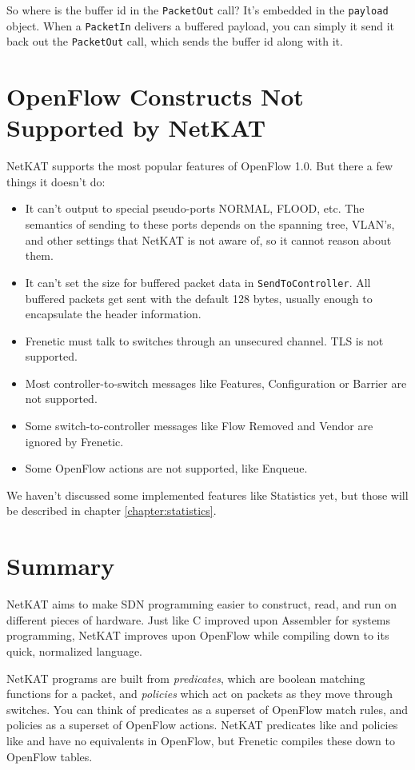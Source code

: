 So where is the buffer id in the \texttt{PacketOut} call?  It's embedded in the \texttt{payload} object.
When a \texttt{PacketIn} delivers a buffered payload, you can simply it send it back out the \texttt{PacketOut}
call, which sends the buffer id along with it.  

\section{OpenFlow Constructs Not Supported by NetKAT}

NetKAT supports the most popular features of OpenFlow 1.0.  But there a few things it doesn't do:

\begin{itemize}
\item It can't output to special pseudo-ports NORMAL, FLOOD, etc.  The semantics of sending to these ports
depends on the spanning tree, VLAN's, and other settings that NetKAT is not aware of, so it cannot reason
about them. 
\item It can't set the size for buffered packet data in \texttt{SendToController}.  All buffered packets
get sent with the default 128 bytes, usually enough to encapsulate the header information.
\item Frenetic must talk to switches through an unsecured channel.  TLS is not supported.
\item Most controller-to-switch messages like Features, Configuration or Barrier are not supported.
\item Some switch-to-controller messages like Flow Removed and Vendor are ignored by Frenetic. 
\item Some OpenFlow actions are not supported, like Enqueue.   
\end{itemize}

We haven't discussed some implemented features like Statistics yet, but those will be described in chapter \ref{chapter:statistics}.

\section{Summary}

NetKAT aims to make SDN programming easier to construct, read, and run on different pieces of hardware.
Just like C improved upon Assembler for systems programming, NetKAT improves upon OpenFlow while compiling down to its
quick, normalized language.  

NetKAT programs are built from \emph{predicates}, which are boolean matching functions for a packet, and \emph{policies}
which act on packets as they move through switches.  You can think of predicates as a superset of OpenFlow match rules, and
policies as a superset of OpenFlow actions.  NetKAT predicates like  and policies like  and
 have no equivalents in OpenFlow, but Frenetic compiles these down to OpenFlow tables.  

